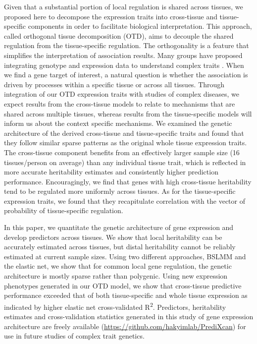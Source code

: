 \documentclass[10pt,letterpaper]{article}
\begin{document}
Given that a substantial portion of local regulation is shared across tissues, we proposed here to decompose the expression traits into cross-tissue and tissue-specific components in order to facilitate biological interpretation. This approach, called orthogonal tissue decomposition (OTD), aims to decouple the shared regulation from the tissue-specific regulation. The orthogonality is a feature that simplifies the interpretation of association results. Many groups have proposed integrating genotype and expression data to understand complex traits \cite{Gamazon_2015,giambartolomei2014bayesian,gusev2016integrative,he2013sherlock,Wheeler_2014,zhu2016integration}. When we find a gene target of interest, a natural question is whether the association is driven by processes within a specific tissue or across all tissues. Through integration of our OTD expression traits with studies of complex diseases, we expect results from the cross-tissue models to relate to mechanisms that are shared across multiple tissues, whereas results from the tissue-specific models will inform us about the context specific mechanisms. We examined the genetic architecture of the derived cross-tissue and tissue-specific traits and found that they follow similar sparse patterns as the original whole tissue expression traits. The cross-tissue component benefits from an effectively larger sample size (16 tissues/person on average) than any individual tissue trait, which is reflected in more accurate heritability estimates and consistently higher prediction performance. Encouragingly, we find that genes with high cross-tissue heritability tend to be regulated more uniformly across tissues. As for the tissue-specific expression traits, we found that they recapitulate correlation with the vector of probability of tissue-specific regulation. 

In this paper, we quantitate the genetic architecture of gene expression and develop predictors across tissues. We show that local heritability can be accurately estimated across tissues, but distal heritability cannot be reliably estimated at current sample sizes. Using two different approaches, BSLMM and the elastic net, we show that for common local gene regulation, the genetic architecture is mostly sparse rather than polygenic. Using new expression phenotypes generated in our OTD model, we show that cross-tissue predictive performance exceeded that of both tissue-specific and whole tissue expression as indicated by higher elastic net cross-validated R\textsuperscript{2}. Predictors, heritability estimates and cross-validation statistics generated in this study of gene expression architecture are freely available (\url{https://github.com/hakyimlab/PrediXcan}) for use in future studies of complex trait genetics.
\end{document}
